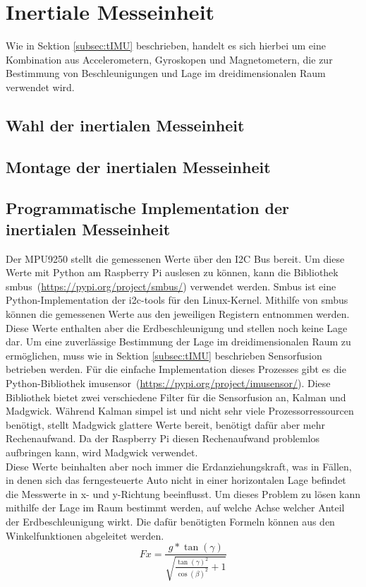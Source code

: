 \section{Inertiale Messeinheit}
\label{sec:IMU}
Wie in Sektion \ref{subsec:tIMU} beschrieben, handelt es sich hierbei um eine Kombination aus Accelerometern, Gyroskopen und Magnetometern, die zur Bestimmung von Beschleunigungen und Lage im dreidimensionalen Raum verwendet wird.
\subsection{Wahl der inertialen Messeinheit}
\label{subsec:IMUchoice}

\subsection{Montage der inertialen Messeinheit}
\label{subsec:IMUmount}

\subsection{Programmatische Implementation der inertialen Messeinheit}
\label{subsec:IMUprogram}
Der MPU9250 stellt die gemessenen Werte über den \ac{I2C} Bus bereit. Um diese Werte mit Python am Raspberry Pi auslesen zu können, kann die Bibliothek \glqq smbus\grqq \ (\url{https://pypi.org/project/smbus/}) verwendet werden. Smbus ist eine Python-Implementation der i2c-tools für den Linux-Kernel. Mithilfe von smbus können die gemessenen Werte aus den jeweiligen Registern entnommen werden. Diese Werte enthalten aber die Erdbeschleunigung und stellen noch keine Lage dar. Um eine zuverlässige Bestimmung der Lage im dreidimensionalen Raum zu ermöglichen, muss wie in Sektion \ref{subsec:tIMU} beschrieben Sensorfusion betrieben werden. Für die einfache Implementation dieses Prozesses gibt es die Python-Bibliothek \glqq imusensor\grqq \ (\url{https://pypi.org/project/imusensor/}). Diese Bibliothek bietet zwei verschiedene Filter für die Sensorfusion an, Kalman und Madgwick. Während Kalman simpel ist und nicht sehr viele Prozessorressourcen benötigt, stellt Madgwick glattere Werte bereit, benötigt dafür aber mehr Rechenaufwand. Da der Raspberry Pi diesen Rechenaufwand problemlos aufbringen kann, wird Madgwick verwendet. \\
Diese Werte beinhalten aber noch immer die Erdanziehungskraft, was in Fällen, in denen sich das ferngesteuerte Auto nicht in einer horizontalen Lage befindet die Messwerte in x- und y-Richtung beeinflusst. Um dieses Problem zu lösen kann mithilfe der Lage im Raum bestimmt werden, auf welche Achse welcher Anteil der Erdbeschleunigung  wirkt. Die dafür benötigten Formeln können aus den Winkelfunktionen abgeleitet werden.
\begin{equation}
Fx=\frac{g*\tan(\gamma)}{\sqrt{\frac{\tan(\gamma)^2}{\cos(\beta)^2}+1}}
\end{equation}

